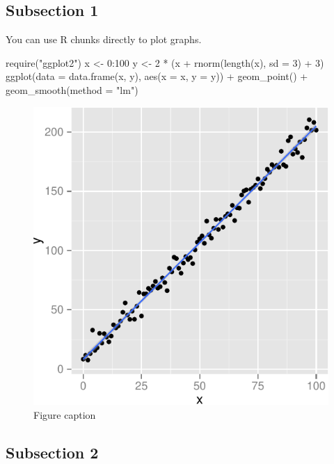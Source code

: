 \documentclass[10pt]{article}
\newenvironment{CodeChunk}{}{}
\begin{document}
\subsection*{Subsection 1}\label{subsection-1}

You can use R chunks directly to plot graphs.

\begin{CodeChunk}
\begin{CodeInput}
require("ggplot2")
x <- 0:100
y <- 2 * (x + rnorm(length(x), sd = 3) + 3)
ggplot(data = data.frame(x, y), 
       aes(x = x, y = y)) + 
  geom_point() + 
  geom_smooth(method = "lm")
\end{CodeInput}
\begin{figure}

{\centering \includegraphics{Untitled_files/figure-latex/graph-1} 

}

\caption[Figure caption]{Figure caption}\label{fig:graph}
\end{figure}
\end{CodeChunk}

\subsection*{Subsection 2}\label{subsection-2}
\end{document}
